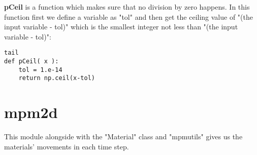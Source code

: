 \documentclass[11pt,fleqn]{book} %
\begin{document}
\textbf{pCeil} is a function which makes sure that no division by zero happens. In this function first we define a variable as "tol" and then get the ceiling value of "(the input variable - tol)" which is the smallest integer not less than "(the input variable - tol)":
\begin{lstlisting}tail
def pCeil( x ):
    tol = 1.e-14
    return np.ceil(x-tol)
\end{lstlisting}



\chapter{mpm2d}
\label{chap:mpm2d}

This module alongside with the "Material" class and "mpmutils" gives us the materials' movements in each time step.
\end{document}
